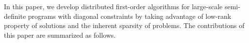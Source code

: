 \documentclass[journal]{IEEEtran}
\begin{document}
\par In this paper, we  develop distributed first-order algorithms for large-scale semi-definite programs with diagonal constraints by taking advantage of low-rank property of solutions and the inherent sparsity of problems.
 The contributions of this paper are summarized as follows.
\end{document}
